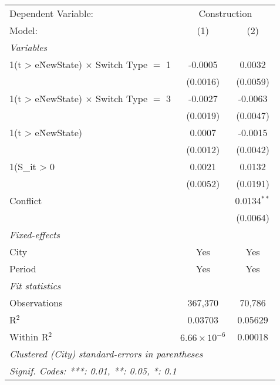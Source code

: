 \begingroup
\centering
\begin{tabular}{lcc}
   \tabularnewline \midrule \midrule
   Dependent Variable: & \multicolumn{2}{c}{Construction}\\
   Model:                                          & (1)                   & (2)\\  
   \midrule
   \emph{Variables}\\
   1(t > e\^NewState) $\times$ Switch Type $=$ 1   & -0.0005               & 0.0032\\   
                                                   & (0.0016)              & (0.0059)\\   
   1(t > e\^NewState) $\times$ Switch Type $=$ 3   & -0.0027               & -0.0063\\   
                                                   & (0.0019)              & (0.0047)\\   
   1(t > e\^NewState)                              & 0.0007                & -0.0015\\   
                                                   & (0.0012)              & (0.0042)\\   
   1(S\_{it} > 0                                   & 0.0021                & 0.0132\\   
                                                   & (0.0052)              & (0.0191)\\   
   Conflict                                        &                       & 0.0134$^{**}$\\   
                                                   &                       & (0.0064)\\   
   \midrule
   \emph{Fixed-effects}\\
   City                                            & Yes                   & Yes\\  
   Period                                          & Yes                   & Yes\\  
   \midrule
   \emph{Fit statistics}\\
   Observations                                    & 367,370               & 70,786\\  
   R$^2$                                           & 0.03703               & 0.05629\\  
   Within R$^2$                                    & $6.66\times 10^{-6}$  & 0.00018\\  
   \midrule \midrule
   \multicolumn{3}{l}{\emph{Clustered (City) standard-errors in parentheses}}\\
   \multicolumn{3}{l}{\emph{Signif. Codes: ***: 0.01, **: 0.05, *: 0.1}}\\
\end{tabular}
\par\endgroup
